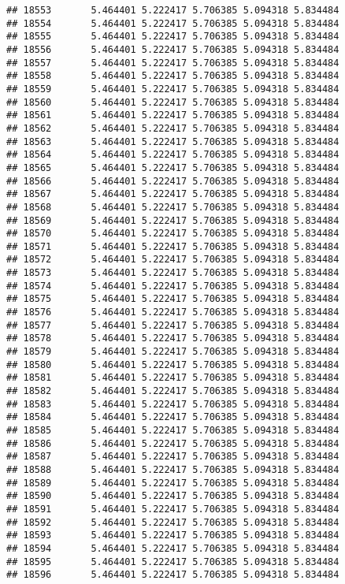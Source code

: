 \documentclass[
]{article}
\begin{document}
\begin{verbatim}
## 18553       5.464401 5.222417 5.706385 5.094318 5.834484
## 18554       5.464401 5.222417 5.706385 5.094318 5.834484
## 18555       5.464401 5.222417 5.706385 5.094318 5.834484
## 18556       5.464401 5.222417 5.706385 5.094318 5.834484
## 18557       5.464401 5.222417 5.706385 5.094318 5.834484
## 18558       5.464401 5.222417 5.706385 5.094318 5.834484
## 18559       5.464401 5.222417 5.706385 5.094318 5.834484
## 18560       5.464401 5.222417 5.706385 5.094318 5.834484
## 18561       5.464401 5.222417 5.706385 5.094318 5.834484
## 18562       5.464401 5.222417 5.706385 5.094318 5.834484
## 18563       5.464401 5.222417 5.706385 5.094318 5.834484
## 18564       5.464401 5.222417 5.706385 5.094318 5.834484
## 18565       5.464401 5.222417 5.706385 5.094318 5.834484
## 18566       5.464401 5.222417 5.706385 5.094318 5.834484
## 18567       5.464401 5.222417 5.706385 5.094318 5.834484
## 18568       5.464401 5.222417 5.706385 5.094318 5.834484
## 18569       5.464401 5.222417 5.706385 5.094318 5.834484
## 18570       5.464401 5.222417 5.706385 5.094318 5.834484
## 18571       5.464401 5.222417 5.706385 5.094318 5.834484
## 18572       5.464401 5.222417 5.706385 5.094318 5.834484
## 18573       5.464401 5.222417 5.706385 5.094318 5.834484
## 18574       5.464401 5.222417 5.706385 5.094318 5.834484
## 18575       5.464401 5.222417 5.706385 5.094318 5.834484
## 18576       5.464401 5.222417 5.706385 5.094318 5.834484
## 18577       5.464401 5.222417 5.706385 5.094318 5.834484
## 18578       5.464401 5.222417 5.706385 5.094318 5.834484
## 18579       5.464401 5.222417 5.706385 5.094318 5.834484
## 18580       5.464401 5.222417 5.706385 5.094318 5.834484
## 18581       5.464401 5.222417 5.706385 5.094318 5.834484
## 18582       5.464401 5.222417 5.706385 5.094318 5.834484
## 18583       5.464401 5.222417 5.706385 5.094318 5.834484
## 18584       5.464401 5.222417 5.706385 5.094318 5.834484
## 18585       5.464401 5.222417 5.706385 5.094318 5.834484
## 18586       5.464401 5.222417 5.706385 5.094318 5.834484
## 18587       5.464401 5.222417 5.706385 5.094318 5.834484
## 18588       5.464401 5.222417 5.706385 5.094318 5.834484
## 18589       5.464401 5.222417 5.706385 5.094318 5.834484
## 18590       5.464401 5.222417 5.706385 5.094318 5.834484
## 18591       5.464401 5.222417 5.706385 5.094318 5.834484
## 18592       5.464401 5.222417 5.706385 5.094318 5.834484
## 18593       5.464401 5.222417 5.706385 5.094318 5.834484
## 18594       5.464401 5.222417 5.706385 5.094318 5.834484
## 18595       5.464401 5.222417 5.706385 5.094318 5.834484
## 18596       5.464401 5.222417 5.706385 5.094318 5.834484

\end{verbatim}
\end{document}
